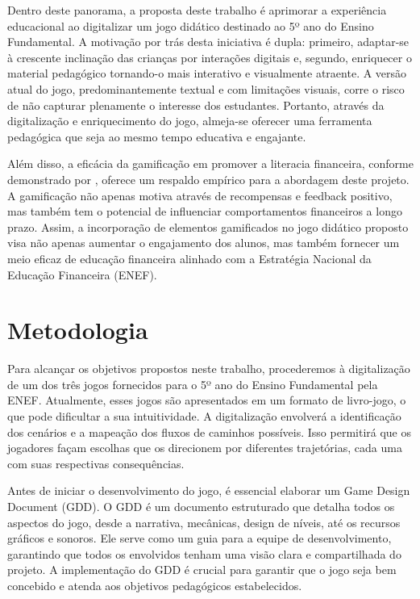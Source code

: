 Dentro deste panorama, a proposta deste trabalho é aprimorar a experiência educacional ao digitalizar um jogo didático destinado ao 5º ano do Ensino Fundamental. A motivação por trás desta iniciativa é dupla: primeiro, adaptar-se à crescente inclinação das crianças por interações digitais e, segundo, enriquecer o material pedagógico tornando-o mais interativo e visualmente atraente. A versão atual do jogo, predominantemente textual e com limitações visuais, corre o risco de não capturar plenamente o interesse dos estudantes. Portanto, através da digitalização e enriquecimento do jogo, almeja-se oferecer uma ferramenta pedagógica que seja ao mesmo tempo educativa e engajante.

Além disso, a eficácia da gamificação em promover a literacia financeira, conforme demonstrado por \cite{inchamnan2019gamification}, oferece um respaldo empírico para a abordagem deste projeto. A gamificação não apenas motiva através de recompensas e feedback positivo, mas também tem o potencial de influenciar comportamentos financeiros a longo prazo. Assim, a incorporação de elementos gamificados no jogo didático proposto visa não apenas aumentar o engajamento dos alunos, mas também fornecer um meio eficaz de educação financeira alinhado com a Estratégia Nacional da Educação Financeira (ENEF).


\section{Metodologia}

Para alcançar os objetivos propostos neste trabalho, procederemos à digitalização de um dos três jogos fornecidos para o 5º ano do Ensino Fundamental pela ENEF. Atualmente, esses jogos são apresentados em um formato de livro-jogo, o que pode dificultar a sua intuitividade. A digitalização envolverá a identificação dos cenários e a mapeação dos fluxos de caminhos possíveis. Isso permitirá que os jogadores façam escolhas que os direcionem por diferentes trajetórias, cada uma com suas respectivas consequências.

Antes de iniciar o desenvolvimento do jogo, é essencial elaborar um Game Design Document (GDD). O GDD é um documento estruturado que detalha todos os aspectos do jogo, desde a narrativa, mecânicas, design de níveis, até os recursos gráficos e sonoros. Ele serve como um guia para a equipe de desenvolvimento, garantindo que todos os envolvidos tenham uma visão clara e compartilhada do projeto. A implementação do GDD é crucial para garantir que o jogo seja bem concebido e atenda aos objetivos pedagógicos estabelecidos\cite{arifudin2022gdd}.

